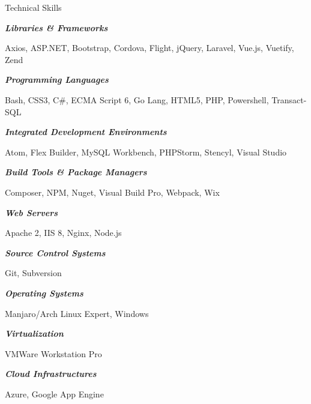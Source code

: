 \documentclass{resume} %
\begin{document}

\begin{rSection}{Technical Skills}

\begin{rSubsection}{}{}{}{}

\item[] \textbf{\textit{Libraries \& Frameworks}}
\item Axios, ASP.NET, Bootstrap, Cordova, Flight, jQuery, Laravel, Vue.js, Vuetify, Zend
\smallskip

\item[] \textbf{\textit{Programming Languages}}
\item Bash, CSS3, C\#, ECMA Script 6, Go Lang, HTML5, PHP, Powershell, Transact-SQL
\vspace{3mm}

\item[] \textbf{\textit{Integrated Development Environments}}
\item Atom, Flex Builder, MySQL Workbench, PHPStorm, Stencyl, Visual Studio
\vspace{3mm}

\item[] \textbf{\textit{Build Tools \& Package Managers}}
\item Composer, NPM, Nuget, Visual Build Pro, Webpack, Wix
\vspace{3mm}

\item[] \textbf{\textit{Web Servers}}
\item Apache 2, IIS 8, Nginx, Node.js
\vspace{3mm}

\item[] \textbf{\textit{Source Control Systems}}
\item Git, Subversion
\vspace{3mm}

\item[] \textbf{\textit{Operating Systems}}
\item Manjaro/Arch Linux Expert, Windows
\vspace{3mm}

\item[] \textbf{\textit{Virtualization}}
\item VMWare Workstation Pro
\vspace{3mm}

\item[] \textbf{\textit{Cloud Infrastructures}}
\item Azure, Google App Engine

\end{rSubsection}

\end{rSection}
\end{document}
